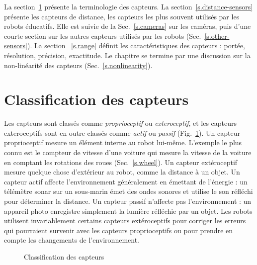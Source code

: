 La section~\ref{s.classify} présente la terminologie des capteurs. La section~\ref{s.distance-sensors} présente les capteurs de distance, les capteurs les plus souvent utilisés par les robots éducatifs. Elle est suivie de la Sec.~\ref{s.cameras} sur les caméras, puis d'une courte section sur les autres capteurs utilisés par les robots (Sec.~\ref{s.other-sensors}). La section ~\ref{s.range} définit les caractéristiques des capteurs : portée, résolution, précision, exactitude. Le chapitre se termine par une discussion sur la non-linéarité des capteurs (Sec.~\ref{s.nonlinearity}).


\section{Classification des capteurs}\label{s.classify}

Les capteurs sont classés comme \emph{proprioceptif} ou \emph{exteroceptif}, et les capteurs exteroceptifs sont en outre classés comme \emph{actif} ou \emph{passif} (Fig.~\ref{fig.sensor-classification}). Un capteur proprioceptif mesure un élément interne au robot lui-même. L'exemple le plus connu est le compteur de vitesse d'une voiture qui mesure la vitesse de la voiture en comptant les rotations des roues (Sec.~\ref{s.wheel}). Un capteur extéroceptif mesure quelque chose d'extérieur au robot, comme la distance à un objet. Un capteur actif affecte l'environnement généralement en émettant de l'énergie : un télémètre sonar sur un sous-marin émet des ondes sonores et utilise le son réfléchi pour déterminer la distance. Un capteur passif n'affecte pas l'environnement : un appareil photo enregistre simplement la lumière réfléchie par un objet. Les robots utilisent invariablement certains capteurs extéroceptifs pour corriger les erreurs qui pourraient survenir avec les capteurs proprioceptifs ou pour prendre en compte les changements de l'environnement.

\begin{figure}
\begin{center}
\caption{Classification des capteurs}\label{fig.sensor-classification}
\end{center}
\end{figure}

